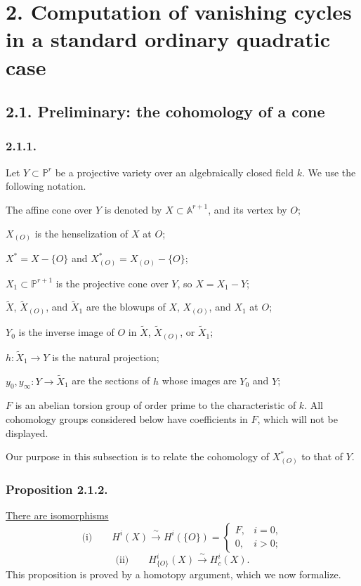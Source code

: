\section*{2. Computation of vanishing cycles in a standard ordinary
quadratic case}

\subsection*{2.1. Preliminary: the cohomology of a cone}

\subsubsection*{2.1.1.}
Let $Y\subset\mathbb P^r$ be a projective variety over an
algebraically closed field $k$.  We use the following notation.

The affine cone over $Y$ is denoted by
$X\subset\mathbb A^{r+1}$, and its vertex by $O$;

$X_{(O)}$ is the henselization of $X$ at $O$;

$X^*=X-\{O\}$ and $X^*_{(O)}=X_{(O)}-\{O\}$;

$X_1\subset\mathbb P^{r+1}$ is the projective cone over $Y$, so
$X=X_1-Y$;

$\widetilde X$, $\widetilde X_{(O)}$, and $\widetilde X_1$ are the
blowups of $X$, $X_{(O)}$, and $X_1$ at $O$;

$Y_0$ is the inverse image of $O$ in $\widetilde X$,
$\widetilde X_{(O)}$, or $\widetilde X_1$;

$h:\widetilde X_1\to Y$ is the natural projection;

$y_0,y_\infty:Y\to\widetilde X_1$ are the sections of $h$ whose
images are $Y_0$ and $Y$;

$F$ is an abelian torsion group of order prime to the characteristic
of $k$.  All cohomology groups considered below have coefficients in
$F$, which will not be displayed.

Our purpose in this subsection is to relate the cohomology of
$X^*_{(O)}$ to that of $Y$.

\subsubsection*{Proposition 2.1.2.}
\underline{There are isomorphisms}
\[
\text{(i)}\qquad
H^i(X)\xrightarrow{\ \sim\ }H^i(\{O\})=
\begin{cases}
F,& i=0,\\
0,& i>0;
\end{cases}
\]
\[
\text{(ii)}\qquad
H^i_{\{O\}}(X)\xrightarrow{\ \sim\ }H^i_c(X).
\]
This proposition is proved by a homotopy argument, which we now
formalize.


